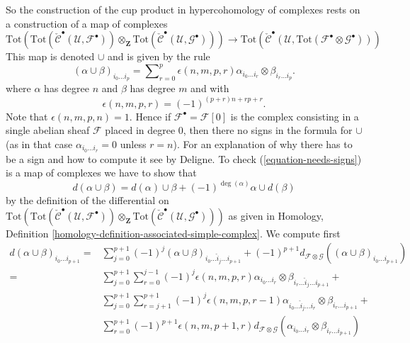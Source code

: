 \medskip\noindent
So the construction of the cup product in hypercohomology
of complexes rests on a construction of a map of complexes
\begin{equation}
\label{equation-needs-signs}
\text{Tot}\left(
\text{Tot}(\check{\mathcal{C}}^\bullet({\mathcal U}, {\mathcal F}^\bullet))
\otimes_{\mathbf Z}
\text{Tot}(\check{\mathcal{C}}^\bullet({\mathcal U}, {\mathcal G}^\bullet))
\right)
\longrightarrow
\text{Tot}(
\check{\mathcal{C}}^\bullet({\mathcal U},
\text{Tot}({\mathcal F}^\bullet\otimes {\mathcal G}^\bullet)
))
\end{equation}
This map is denoted $\cup$ and is given by the rule
$$
(\alpha \cup \beta)_{i_0 \ldots i_p}
=
\sum\nolimits_{r = 0}^p
\epsilon(n, m, p, r)
\alpha_{i_0 \ldots i_r} \otimes \beta_{i_r \ldots i_p}.
$$
where $\alpha$ has degree $n$ and $\beta$ has degree $m$
and with
$$
\epsilon(n, m, p, r) = (-1)^{(p + r)n + rp + r}.
$$
Note that $\epsilon(n, m, p, n) = 1$. Hence if
$\mathcal{F}^\bullet = \mathcal{F}[0]$ is the complex
consisting in a single abelian sheaf $\mathcal{F}$ placed in degree $0$,
then there no signs in the formula for $\cup$ (as in that case
$\alpha_{i_0 \ldots i_r} = 0$ unless $r = n$).
For an explanation of why there has to be a sign and how to
compute it see \cite[Exposee XVII]{SGA4} by Deligne.
To check (\ref{equation-needs-signs})
is a map of complexes we have to show that
$$
d(\alpha \cup \beta) =
d(\alpha) \cup \beta +
(-1)^{\deg(\alpha)} \alpha \cup d(\beta)
$$
by the definition of the differential on
$\text{Tot}(
\text{Tot}(\check{\mathcal{C}}^\bullet({\mathcal U}, {\mathcal F}^\bullet))
\otimes_{\mathbf Z}
\text{Tot}(\check{\mathcal{C}}^\bullet({\mathcal U}, {\mathcal G}^\bullet))
)$
as given in
Homology, Definition \ref{homology-definition-associated-simple-complex}.
We compute first
\begin{align*}
d(\alpha \cup \beta)_{i_0 \ldots i_{p + 1}}
= &
\sum\nolimits_{j = 0}^{p + 1}
(-1)^j
(\alpha \cup \beta)_{i_0 \ldots \hat i_j \ldots i_{p + 1}}
+
(-1)^{p + 1}
d_{{\mathcal F} \otimes {\mathcal G}}
((\alpha \cup \beta)_{i_0 \ldots i_{p + 1}})
\\
= &
\sum\nolimits_{j = 0}^{p + 1}
\sum\nolimits_{r = 0}^{j - 1}
(-1)^j \epsilon(n, m, p, r)
\alpha_{i_0 \ldots i_r} \otimes \beta_{i_r \ldots \hat i_j \ldots i_{p + 1}}
+ \\
&
\sum\nolimits_{j = 0}^{p + 1}
\sum\nolimits_{r = j + 1}^{p + 1}
(-1)^j \epsilon(n, m, p, r - 1)
\alpha_{i_0 \ldots \hat i_j \ldots i_r} \otimes \beta_{i_r \ldots i_{p + 1}}
+ \\
&
\sum\nolimits_{r = 0}^{p + 1}
(-1)^{p + 1} \epsilon(n, m, p + 1, r)
d_{{\mathcal F} \otimes {\mathcal G}}
(\alpha_{i_0 \ldots i_r} \otimes \beta_{i_r \ldots i_{p + 1}})
\end{align*}
